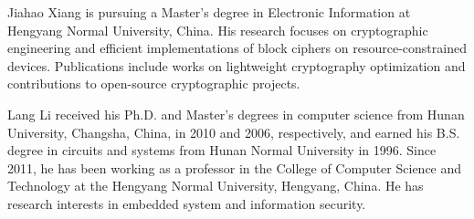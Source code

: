 \documentclass[journal]{IEEEtran}
\begin{document}






\begin{IEEEbiography}{Jiahao Xiang}
  is pursuing a Master's degree in Electronic Information at Hengyang Normal University, China. His research focuses on cryptographic engineering and efficient implementations of block ciphers on resource-constrained devices. Publications include works on lightweight cryptography optimization and contributions to open-source cryptographic projects.
\end{IEEEbiography}

\begin{IEEEbiography}{Lang Li}
  received his Ph.D. and Master's degrees in computer science from Hunan University, Changsha, China, in 2010 and 2006, respectively, and earned his B.S. degree in circuits and systems from Hunan Normal University in 1996. Since 2011, he has been working as a professor in the College of Computer Science and Technology at the Hengyang Normal University, Hengyang, China. He has research interests in embedded system and information security.
\end{IEEEbiography}
\end{document}
